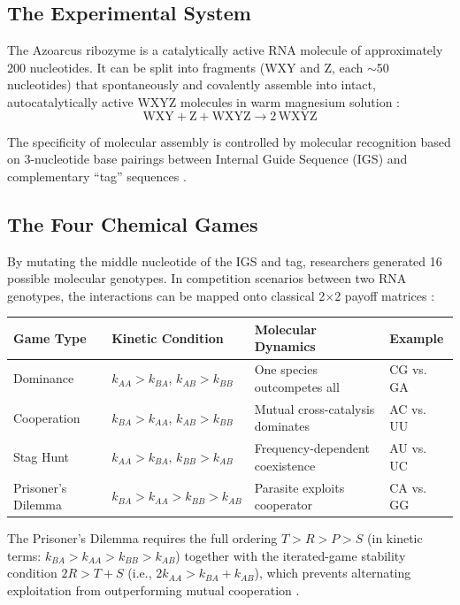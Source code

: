 \documentclass[12pt,a4paper]{article}
\theoremstyle{remark}
\begin{document}
\subsection{The Experimental System}

The Azoarcus ribozyme is a catalytically active RNA molecule of approximately 200 nucleotides. It can be split into fragments (WXY and Z, each $\sim$50 nucleotides) that spontaneously and covalently assemble into intact, autocatalytically active WXYZ molecules in warm magnesium solution \citep{AzoarcusPMC}:
\begin{equation}
\text{WXY} + \text{Z} + \text{WXYZ} \longrightarrow 2\,\text{WXYZ}
\end{equation}

The specificity of molecular assembly is controlled by molecular recognition based on 3-nucleotide base pairings between Internal Guide Sequence (IGS) and complementary ``tag'' sequences \citep{AzoarcusPNAS}.

\subsection{The Four Chemical Games}

By mutating the middle nucleotide of the IGS and tag, researchers generated 16 possible molecular genotypes. In competition scenarios between two RNA genotypes, the interactions can be mapped onto classical 2$\times$2 payoff matrices \citep{AzoarcusPMC}:

\begin{center}
\begin{tabular}{llll}
\toprule
\textbf{Game Type} & \textbf{Kinetic Condition} & \textbf{Molecular Dynamics} & \textbf{Example} \\
\midrule
Dominance & $k_{AA} > k_{BA}$, $k_{AB} > k_{BB}$ & One species outcompetes all & CG vs. GA \\
Cooperation & $k_{BA} > k_{AA}$, $k_{AB} > k_{BB}$ & Mutual cross-catalysis dominates & AC vs. UU \\
Stag Hunt & $k_{AA} > k_{BA}$, $k_{BB} > k_{AB}$ & Frequency-dependent coexistence & AU vs. UC \\
Prisoner's Dilemma & $k_{BA} > k_{AA} > k_{BB} > k_{AB}$ & Parasite exploits cooperator & CA vs. GG \\
\bottomrule
\end{tabular}
\end{center}

\noindent
The Prisoner's Dilemma requires the full ordering $T > R > P > S$ (in kinetic terms: $k_{BA} > k_{AA} > k_{BB} > k_{AB}$) together with the iterated-game stability condition $2R > T + S$ (i.e., $2k_{AA} > k_{BA} + k_{AB}$), which prevents alternating exploitation from outperforming mutual cooperation \citep{HofbauerSigmund1998}.
\end{document}
